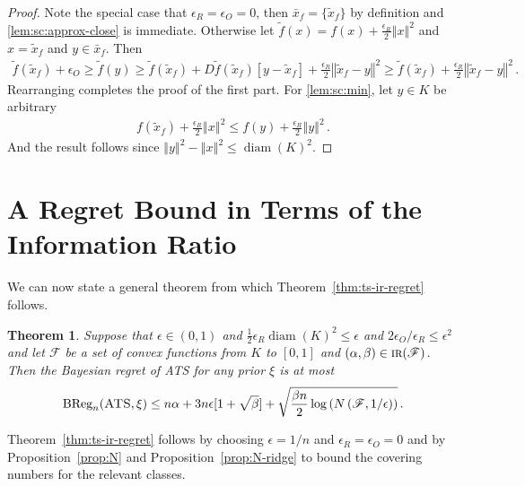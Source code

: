 \documentclass[letter, 12pt]{report}
\newcommand{\epsR}{{\epsilon_R}}
\newcommand{\epsO}{{\epsilon_O}}
\newcommand{\BReg}{\textrm{BReg}}
\newcommand{\norm}[1]{\left \Vert  #1 \right \Vert}
\newcommand{\sF}{\mathscr F}
\newcommand{\diam}{\operatorname{diam}}
\newcommand{\1}{\mathbf{1}}
\newcommand{\IR}{\operatorname{\textsc{ir}}}
\newcommand{\ats}{\textsc{ATS}}
\theoremstyle{plain}
\newtheorem{theorem}{Theorem}
\theoremstyle{definition}
\theoremstyle{remark}
\begin{document}
\begin{proof}
    Note the special case that $\epsR = \epsO = 0$, then $\bar x_f = \{\tilde x_f\}$ by definition and \ref{lem:sc:approx-close} is immediate.
    Otherwise
    let $\tilde f(x) = f(x) + \frac{\epsR}{2} \norm{x}^2$
    and $x = \tilde x_f$ and $y \in \bar x_f$. Then
    \begin{align*}
        \tilde f(\tilde x_f) + \epsO
        \geq \tilde f(y)
        \geq \tilde f(\tilde x_f) + D\tilde f(\tilde x_f)[y - \tilde x_f] + \frac{\epsR}{2} \norm{\tilde x_f - y}^2
        \geq \tilde f(\tilde x_f) + \frac{\epsR}{2} \norm{\tilde x_f - y}^2 \,.
    \end{align*}
    Rearranging completes the proof of the first part.
    For \ref{lem:sc:min}, let $y \in K$ be arbitrary
    \begin{align*}
        f(\tilde x_f) + \frac{\epsR}{2} \norm{x}^2 \leq f(y) + \frac{\epsR}{2} \norm{y}^2  \,.
    \end{align*}
    And the result follows since $\norm{y}^2 - \norm{x}^2 \leq \diam(K)^2$.
\end{proof}


\section{A Regret Bound in Terms of the Information Ratio}\label{sec:ir-general}
We can now state a general theorem from which Theorem~\ref{thm:ts-ir-regret} follows.

\begin{theorem}\label{thm:ir-general}
    Suppose that $\epsilon \in (0,1)$ and $\frac{1}{2} \epsR \diam(K)^2 \leq \epsilon$ and $2\epsO/\epsR \leq \epsilon^2$
    and let $\sF$ be a set of convex functions from $K$ to $[0,1]$ and $(\alpha, \beta) \in \IR(\sF)$.
    Then the Bayesian regret of \ats{} for any prior $\xi$ is at most
    \begin{align*}
        \BReg_n(\ats, \xi) \leq n \alpha + 3n\epsilon[1 + \sqrt{\beta}] + \sqrt{\frac{\beta n}{2} \log\left(N\left(\sF, 1/\epsilon\right)\right)} \,.
    \end{align*}
\end{theorem}

Theorem~\ref{thm:ts-ir-regret} follows by choosing $\epsilon = 1/n$ and $\epsR = \epsO = 0$ and by
Proposition~\ref{prop:N} and Proposition~\ref{prop:N-ridge} to bound the covering numbers for the relevant classes.
\end{document}
